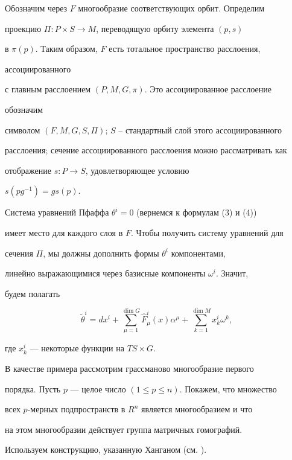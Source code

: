 Обозначим через $F$ многообразие соответствующих орбит. Определим


проекцию $\varPi: P \times S \to M$, переводящую орбиту элемента $(p,s)$


в $\pi(p)$. Таким образом, $F$ есть тотальное пространство расслоения,


ассоциированного


с главным расслоением $(P,M,G,\pi)$. Это ассоциированное расслоение


обозначим


символом $(F,M,G,S,\varPi)$; $S$ -- стандартный слой этого ассоциированного


расслоения; сечение ассоциированного расслоения можно рассматривать как


отображение $s: P \to S$, удовлетворяющее условию


$s(pg^{-1}) = gs(p)$.





Система уравнений Пфаффа $\theta^i = 0$ (вернемся к формулам (3) и (4))


имеет место для каждого слоя в $F$. Чтобы получить систему уравнений для


сечения $\varPi$, мы должны дополнить формы $\theta^i$ компонентами,


линейно выражающимися через базисные компоненты $\omega^i$. Значит,


будем полагать


\begin{equation}


\widetilde \theta^i = dx^i +


\sum_{\mu = 1}^{\dim G} \widehat F^i_{\mu} (x) \alpha^\mu +


\sum_{k=1}^{\dim M} x^i_k \omega^k,


\end{equation}


где $x^i_k$ --- некоторые функции на $TS \times G$.





В качестве примера рассмотрим грассманово многообразие первого


порядка. Пусть $p$ --- целое число $(1 \le p\le n)$. Покажем, что множество


всех $p$-мерных подпространств в $R^n$ является многообразием и что


на этом многообразии действует группа матричных гомографий.


Используем конструкцию, указанную Ханганом (см. \cite{5}).





